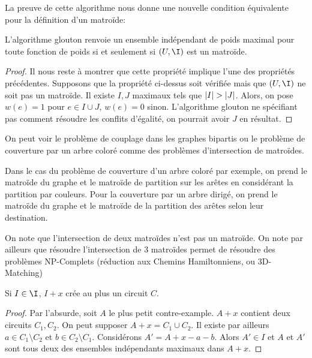 \documentclass[math, info]{cours}
\begin{document}
La preuve de cette algorithme nous donne une nouvelle condition équivalente pour la définition d'un matroïde:
\begin{proposition}
	L'algorithme glouton renvoie un ensemble indépendant de poids maximal pour toute fonction de poids si et seulement si $(U, \I)$ est un matroïde.
	\label{prop:greedymatroid}
\end{proposition}
\begin{proof}
	Il nous reste à montrer que cette propriété implique l'une des propriétés précédentes.
	Supposons que la propriété ci-dessus soit vérifiée mais que $\left(U, \I\right)$ ne soit pas un matroïde.
	Il existe $I, J$ maximaux tels que $\left|I\right| > \left|J\right|$.
	Alors, on pose $w(e) = 1$ pour $e \in I \cup J$, $w(e) = 0$ sinon.
	L'algorithme glouton ne spécifiant pas comment résoudre les conflits d'égalité, on pourrait avoir $J$ en résultat.
\end{proof}


On peut voir le problème de couplage dans les graphes bipartis ou le problème de couverture par un arbre coloré comme des problèmes d'intersection de matroïdes.

Dans le cas du problème de couverture d'un arbre coloré par exemple, on prend le matroïde du graphe et le matroïde de partition sur les arêtes en considérant la partition par couleurs.
Pour la couverture par un arbre dirigé, on prend le matroïde du graphe et le matroïde de la partition des arêtes selon leur destination.

On note que l'intersection de deux matroïdes n'est pas un matroïde.
On note par ailleurs que résoudre l'intersection de 3 matroïdes permet de résoudre des problèmes NP-Complets (réduction aux Chemins Hamiltonniens, ou 3D-Matching)

\begin{lemme}
	Si $I \in \I$, $I + x$ crée au plus un circuit $C$.
\end{lemme}
\begin{proof}
	Par l'absurde, soit $A$ le plus petit contre-example. $A + x$ contient deux circuits $C_{1}, C_{2}$.
	On peut supposer $A + x = C_{1} \cup C_{2}$.
	Il existe par ailleurs $a \in C_{1} \setminus C_{2}$ et $b \in C_{2} \setminus C_{1}$.
	Considérons $A' = A + x - a - b$.
	Alors $A' \in I$ et $A$ et $A'$ sont tous deux des ensembles indépendants maximaux dans $A + x$.
\end{proof}
\end{document}
